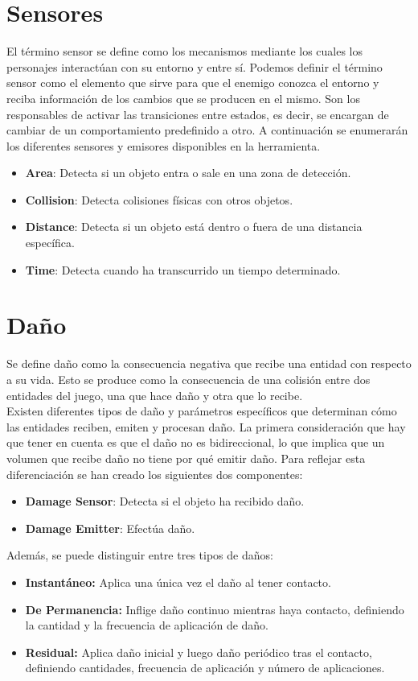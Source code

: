 \section{Sensores}
\label{subsec:sensores}
El término sensor se define como los mecanismos mediante los cuales los personajes interactúan con su entorno y entre sí.
Podemos definir el término sensor como el elemento que sirve para que el enemigo conozca el entorno y reciba información de los cambios que se producen en el mismo. Son los responsables de activar las transiciones entre estados, es decir, se encargan de cambiar de un comportamiento predefinido a otro.
A continuación se enumerarán los diferentes sensores y emisores disponibles en la herramienta.
\begin{itemize}
    \item \textbf{Area}: Detecta si un objeto entra o sale en una zona de detección.
    \item \textbf{Collision}: Detecta colisiones físicas con otros objetos.
    \item \textbf{Distance}: Detecta si un objeto está dentro o fuera de una distancia específica.
    \item \textbf{Time}: Detecta cuando ha transcurrido un tiempo determinado.
\end{itemize}
\section{Daño}
Se define daño como la consecuencia negativa que recibe una entidad con respecto a su vida. Esto se produce como la consecuencia de una colisión entre dos entidades del juego, una que hace daño y otra que lo recibe.\\
Existen diferentes tipos de daño y parámetros específicos que determinan cómo las entidades reciben, emiten y procesan daño.
La primera consideración que hay que tener en cuenta es que el daño no es bidireccional, lo que implica que un volumen que recibe daño no tiene por qué emitir daño. Para reflejar esta diferenciación se han creado los siguientes dos componentes:
\begin{itemize}
    \item \textbf{Damage Sensor}: Detecta si el objeto ha recibido daño.
    \item \textbf{Damage Emitter}: Efectúa daño.
\end{itemize}

Además, se puede distinguir entre tres tipos de daños:
\begin{itemize}
    \item \textbf{Instantáneo:} Aplica una única vez el daño al tener contacto.
    \item \textbf{De Permanencia:} Inflige daño continuo mientras haya contacto, definiendo la cantidad y la frecuencia de aplicación de daño.
    \item \textbf{Residual:} Aplica daño inicial y luego daño periódico tras el contacto, definiendo cantidades, frecuencia de aplicación y número de aplicaciones.
\end{itemize}

